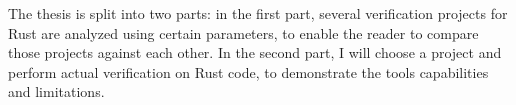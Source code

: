 The thesis is split into two parts: in the first part, several verification projects for Rust are analyzed using certain parameters, to enable the reader to compare those projects against each other. In the second part, I will choose a project and perform actual verification on Rust code, to demonstrate the tools capabilities and limitations.